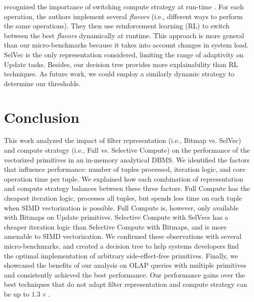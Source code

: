 \documentclass[12pt]{cmuthesis}
\begin{document}
\citeauthor{miro_adapt} recognized the importance of switching compute strategy at run-time \cite{miro_adapt}. For each operation, the authors implement several \textit{flavors} (i.e., different ways to perform the same operations). They then use reinforcement learning (RL) to switch between the best \textit{flavors} dynamically at runtime. This approach is more general than our micro-benchmarks because it takes into account changes in system load. SelVec is the only representation considered, limiting the range of adaptivity on Update tasks. Besides, our decision tree provides more explainability than RL techniques. As future work, we could employ a similarly dynamic strategy to determine our thresholds.

\chapter{Conclusion}
\label{chapter6}
This work analyzed the impact of filter representation (i.e., Bitmap vs. SelVec) and compute strategy (i.e., Full vs. Selective Compute) on the performance of the vectorized primitives in an in-memory analytical DBMS. We identified the factors that influence performance: number of tuples processed, iteration logic, and core operation time per tuple. We explained how each combination of representation and compute strategy balances between these three factors. Full Compute has the cheapest iteration logic, processes all tuples, but spends less time on each tuple when SIMD vectorization is possible. Full Compute is, however, only available with Bitmaps on Update primitives. Selective Compute with SelVecs has a cheaper iteration logic than Selective Compute with Bitmaps, and is more amenable to SIMD vectorization. We confirmed these observations with several micro-benchmarks, and created a decision tree to help systems developers find the optimal implementation of arbitrary side-effect-free primitives. Finally, we showcased the benefits of our analysis on OLAP queries with multiple primitives and consistently achieved the best performance. Our performance gains over the best techniques that do not adapt filter representation and compute strategy can be up to $1.3\times$.

%

\backmatter


\renewcommand{\bibsection}{\chapter{\bibname}}

\end{document}
